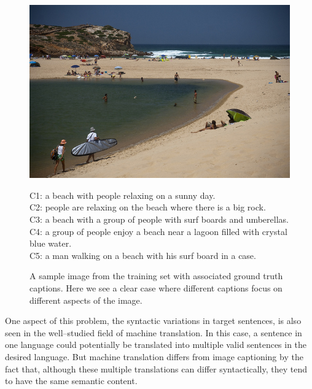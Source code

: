 \begin{figure}[t]
    \begin{minipage}[c]{0.5\linewidth}
            \includegraphics[width=\textwidth]{images/COCO_train2014_000000440903.jpg}
    \end{minipage}\hfill
    \begin{minipage}[c]{0.5\linewidth}
       C1: a beach with people relaxing on a sunny day. \\
       C2: people are relaxing on the beach where there is a big rock. \\
       C3: a beach with a group of people with surf boards and umberellas. \\
       C4: a group of people enjoy a beach near a lagoon filled with crystal blue
       water. \\
       C5: a man walking on a beach with his surf board in a case. \\
    \end{minipage}
  \vspace*{-3mm}
  \caption{ A sample image from the training set with associated ground truth
  captions. Here we see a clear case where different captions focus on different
  aspects of the image.
  }
  \label{fig_capdiversity}
\end{figure}

One aspect of this problem, the syntactic variations in target sentences, is also
seen in the well--studied field of machine translation.
In this case, a sentence in one language could potentially be translated into
multiple valid sentences in the desired language.
But machine translation differs from image captioning by the fact that, although
these multiple translations can differ syntactically, they tend to have the same
semantic content.

